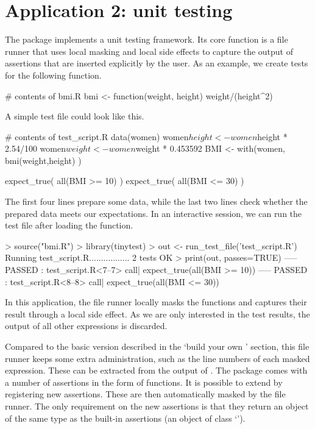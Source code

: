 \section{Application 2: unit testing}
The  package \citep{loo2019tinytest} implements a unit testing
framework. Its core function is a file runner that uses local masking and local
side effects to capture the output of assertions that are inserted explicitly by
the user.  As an example, we create tests for the following function. 
\begin{example}
  # contents of bmi.R
  bmi <- function(weight, height) weight/(height^2)
\end{example}
%
A simple  test file could look like this.
\begin{example}
  # contents of test_script.R
  data(women)
  women$height <- women$height * 2.54/100
  women$weight <- women$weight * 0.453592
  BMI    <- with(women, bmi(weight,height) )

  expect_true( all(BMI >= 10) )
  expect_true( all(BMI <= 30) )
\end{example}
The first four lines prepare some data, while the last two lines check whether
the prepared data meets our expectations.  In an interactive session, we can run
the test file after loading the  function.
\begin{example}
  > source("bmi.R")
  > library(tinytest)
  > out <- run_test_file('test_script.R')
  Running test_script.R.................    2 tests OK
  > print(out, passes=TRUE)
  ----- PASSED      : test_script.R<7--7>
   call| expect_true(all(BMI >= 10))
  ----- PASSED      : test_script.R<8--8>
   call| expect_true(all(BMI <= 30))
\end{example}

In this application, the file runner locally masks the  functions
and captures their result through a local side effect. As we are only
interested in the test results, the output of all other expressions is
discarded.

Compared to the basic version described in the `build your own '
section, this file runner keeps some extra administration, such as the line
numbers of each masked expression. These can be extracted from the output of
. The package comes with a number of assertions in the form of
 functions. It is possible to extend  by
registering new assertions. These are then automatically masked by the file
runner. The only requirement on the new assertions is that they return an
object of the same type as the built-in assertions (an object of class
`').



